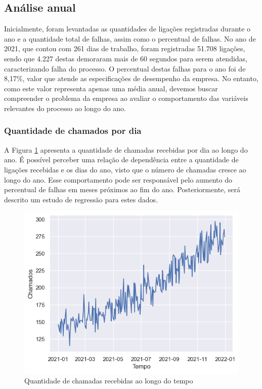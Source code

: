 \subsection{Análise anual}
Inicialmente, foram levantadas as quantidades de ligações registradas durante o ano e a quantidade total de falhas, assim como o percentual de falhas. No ano de 2021, que contou com 261 dias de trabalho, foram registradas 51.708 ligações, sendo que 4.227 destas demoraram mais de 60 segundos para serem atendidas, caracterizando falha do processo. O percentual destas falhas para o ano foi de 8,17\%, valor que atende as especificações de desempenho da empresa. No entanto, como este valor representa apenas uma média anual, devemos buscar compreender o problema da empresa ao avaliar o comportamento das variáveis relevantes do processo ao longo do ano.

\subsubsection{Quantidade de chamados por dia}
A Figura \ref*{fig: chamados-tempo} apresenta a quantidade de chamadas recebidas por dia ao longo do ano. É possível perceber uma relação de dependência entre a quantidade de ligações recebidas e os dias do ano, visto que o número de chamadas cresce ao longo do ano. Esse comportamento pode ser responsável pelo aumento do percentual de falhas em meses próximos ao fim do ano. Posteriormente, será descrito um estudo de regressão para estes dados.

\begin{figure}[H]
    \includegraphics{analise-de-dados/anual/chamados.png}
    \caption{Quantidade de chamadas recebidas ao longo do tempo}
    \label{fig: chamados-tempo}
\end{figure}

